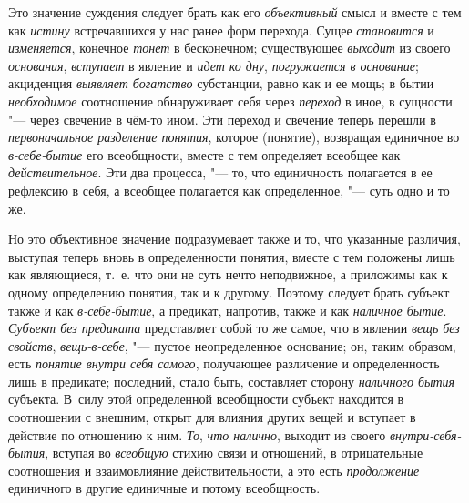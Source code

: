 {\label{bkm:bm31a}Это значение суждения следует брать как его
{\em объективный} смысл и
вместе с тем как {\em истину}
встречавшихся у нас ранее форм перехода. Сущее
{\em становится} и
{\em изменяется},
конечное {\em тонет}
в бесконечном; существующее
{\em выходит} из своего
{\em основания},
{\em вступает} в явление и
{\em идет ко дну},
{\em погружается в основание};
акциденция {\em выявляет
богатство }субстанции, равно как и ее мощь; в бытии
{\em необходимое}
соотношение обнаруживает себя через
{\em переход} в иное, в
сущности "--- через свечение в чём-то ином. Эти переход и
свечение теперь перешли в
{\em первоначальное разделение
понятия}, которое (понятие), возвращая единичное во
{\em в-себе-бытие} его
всеобщности, вместе с тем определяет всеобщее как
{\em действительное}. Эти
два процесса, "--- то, что единичность полагается в ее
рефлексию в себя, а всеобщее полагается как определенное, "---
суть одно и то же.

Но это объективное значение подразумевает также и то, что
указанные различия, выступая теперь вновь в определенности понятия, вместе
с тем положены лишь как являющиеся, т.~е. что они не суть нечто
неподвижное, а приложимы как к одному определению понятия, так и к другому.
Поэтому следует брать субъект также и как
{\em в-себе-бытие}, а
предикат, напротив, также и как
{\em наличное бытие}.
{\em Субъект без предиката}
представляет собой то же самое, что в явлении
{\em вещь без свойств},
{\em вещь-в-себе}, "---
пустое неопределенное основание; он, таким образом, есть
{\em понятие внутри себя самого},
получающее различение и определенность лишь в предикате;
последний, стало быть, составляет сторону
{\em наличного бытия}
субъекта. В~силу этой определенной всеобщности субъект
находится в соотношении с внешним, открыт для влияния других вещей и
вступает в действие по отношению к ним.
{\em То},
{\em что налично}, выходит
из своего {\em внутри-себя-бытия},
вступая во {\em всеобщую}
стихию связи и отношений, в отрицательные соотношения и
взаимовлияние действительности, а это есть
{\em продолжение}
единичного в другие единичные и потому всеобщность.

}
